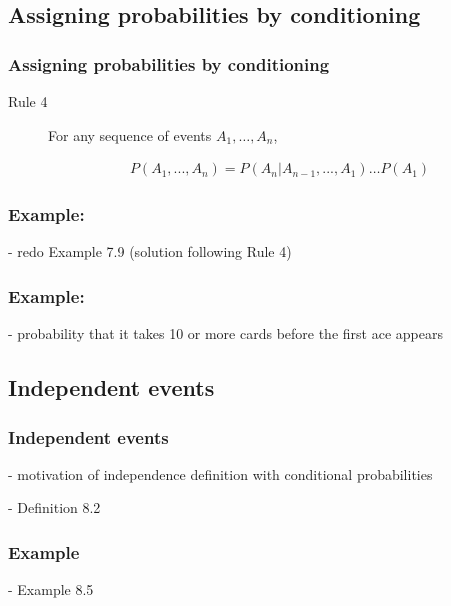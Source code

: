 \subsection{Assigning probabilities by conditioning}

\begin{frame}
    \frametitle{Assigning probabilities by conditioning}

    \begin{description}

        \item[Rule 4] For any sequence of events $A_1,\ldots,A_n$,

            \begin{align*}
                P(A_1, ..., A_n) = P(A_n|A_{n-1}, ..., A_1) \ldots P(A_1)
            \end{align*}

    \end{description}

\end{frame}

\begin{frame}
    \frametitle{Example:}

    - redo Example 7.9 (solution following Rule 4)

\end{frame}

\begin{frame}
    \frametitle{Example:}

    - probability that it takes 10 or more cards before the first ace appears

\end{frame}

\subsection{Independent events}

\begin{frame}
    \frametitle{Independent events}

- motivation of independence definition with conditional probabilities

- Definition 8.2

\end{frame}

\begin{frame}
    \frametitle{Example}

- Example 8.5

\end{frame}


